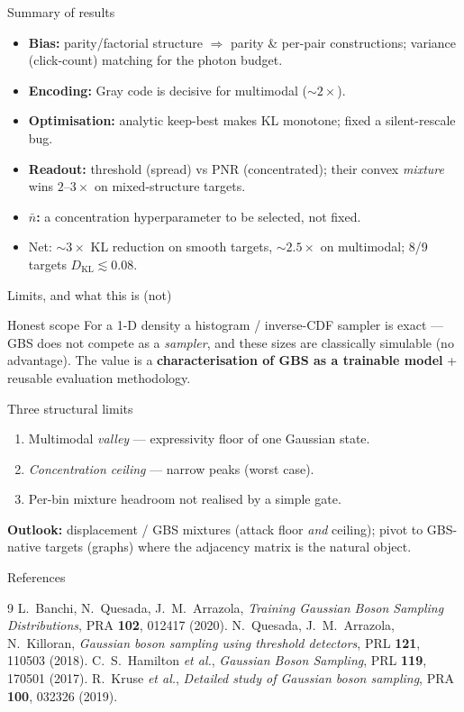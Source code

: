 \documentclass[10pt,aspectratio=169]{beamer}
\newcommand{\KL}{D_{\mathrm{KL}}}
\newcommand{\nmean}{\bar n}
\begin{document}
\begin{frame}{Summary of results}
\begin{itemize}
  \item \textbf{Bias:} parity/factorial structure $\Rightarrow$ parity \& per-pair
        constructions; variance (click-count) matching for the photon budget.
  \item \textbf{Encoding:} Gray code is decisive for multimodal ($\sim2\times$).
  \item \textbf{Optimisation:} analytic keep-best makes KL monotone; fixed a
        silent-rescale bug.
  \item \textbf{Readout:} threshold (spread) vs PNR (concentrated); their convex
        \emph{mixture} wins $2$--$3\times$ on mixed-structure targets.
  \item \textbf{$\nmean$:} a concentration hyperparameter to be selected, not fixed.
  \item Net: $\sim3\times$ KL reduction on smooth targets, $\sim2.5\times$ on
        multimodal; 8/9 targets $\KL\lesssim0.08$.
\end{itemize}
\end{frame}

\begin{frame}{Limits, and what this is (not)}
\begin{block}{Honest scope}
For a 1-D density a histogram / inverse-CDF sampler is exact --- GBS does not
compete as a \emph{sampler}, and these sizes are classically simulable (no
advantage). The value is a \textbf{characterisation of GBS as a trainable
model} + reusable evaluation methodology.
\end{block}
\begin{block}{Three structural limits}
\begin{enumerate}
  \item Multimodal \emph{valley} — expressivity floor of one Gaussian state.
  \item \emph{Concentration ceiling} — narrow peaks (worst case).
  \item Per-bin mixture headroom not realised by a simple gate.
\end{enumerate}
\end{block}
\textbf{Outlook:} displacement / GBS mixtures (attack floor \emph{and} ceiling);
pivot to GBS-native targets (graphs) where the adjacency matrix is the natural
object.
\end{frame}

\begin{frame}{References}
\footnotesize
\begin{thebibliography}{9}
 L.~Banchi, N.~Quesada, J.~M.~Arrazola,
\emph{Training Gaussian Boson Sampling Distributions}, PRA \textbf{102}, 012417 (2020).
 N.~Quesada, J.~M.~Arrazola, N.~Killoran,
\emph{Gaussian boson sampling using threshold detectors}, PRL \textbf{121}, 110503 (2018).
 C.~S.~Hamilton \emph{et al.},
\emph{Gaussian Boson Sampling}, PRL \textbf{119}, 170501 (2017).
 R.~Kruse \emph{et al.},
\emph{Detailed study of Gaussian boson sampling}, PRA \textbf{100}, 032326 (2019).
\end{thebibliography}
\end{frame}
\end{document}
